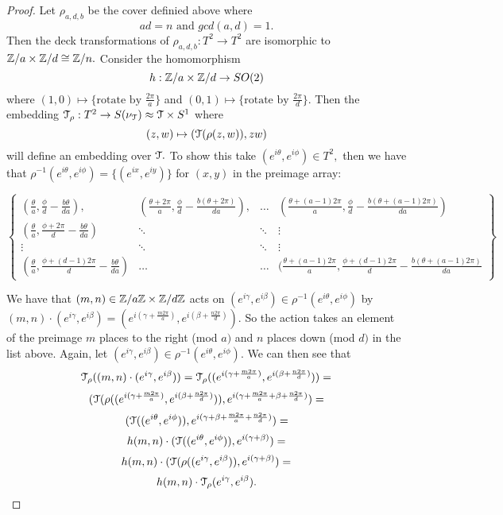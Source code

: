 \documentclass[a4paper, 12 pt, reqno]{amsart}
\theoremstyle{definition}
\theoremstyle{remark}
\begin{document}
\begin{proof} 
Let $\rho_{a,d,b}$ be the cover definied above where $$ad = n \text{ and } gcd(a, d) = 1.$$ Then the deck transformations of $\rho_{a,d,b}: T^{2} \rightarrow T^{2}$ are isomorphic to $\mathbb Z/a \times \mathbb Z/d \cong \mathbb Z/n.$ Consider the homomorphism 
$$h: \mathbb Z/a \times \mathbb Z/d \rightarrow SO(2)$$ where $(1, 0) \mapsto \{\text{rotate by } \frac{2\pi}{a}\}$ and $(0, 1) \mapsto \{\text{rotate by } \frac{2\pi}{d}\}.$ Then the embedding $\mathcal T_{\rho}: T^{2} \rightarrow S(\nu_{\mathcal T}) \approx \mathcal T \times S^{1}$ where $$(z,w) \mapsto (\mathcal T(\rho(z,w)), zw)$$ will define an embedding over $\mathcal T.$ To show this take $(e^{i\theta}, e^{i\phi}) \in T^{2},$ then we have that $\rho^{-1}(e^{i\theta}, e^{i\phi}) = \{(e^{ix}, e^{iy})\}$ for $(x, y)$ in the preimage array:

$$
\begin{Bmatrix} %
(\frac{\theta}{a} , \frac{\phi}{d} - \frac{b\theta}{da}), & (\frac{\theta + 2\pi}{a}, \frac{\phi}{d} - \frac{b(\theta + 2\pi)}{da}), &  \hdots & (\frac{\theta + (a - 1)2\pi}{a}, \frac{\phi}{d} - \frac{b(\theta + (a - 1)2\pi)}{da})\\
(\frac{\theta}{a}, \frac{\phi + 2\pi}{d} - \frac{b\theta}{da}) & \ddots & \ddots & \vdots\\
\vdots & \ddots & \ddots & \vdots\\
(\frac{\theta}{a}, \frac{\phi + (d - 1)2\pi}{d} - \frac{b\theta}{da}) & \hdots & \hdots & (\frac{\theta + (a-1)2\pi}{a} , \frac{\phi + (d - 1)2\pi}{d} - \frac{b(\theta + (a - 1)2\pi)}{da} 
\end{Bmatrix}
$$

 We have that $(m, n) \in \mathbb Z/a\mathbb Z \times \mathbb Z/d\mathbb Z$ acts on $(e^{i\gamma}, e^{i\beta}) \in \rho^{-1}(e^{i\theta}, e^{i\phi})$ by $(m, n) \cdot (e^{i\gamma}, e^{i\beta}) = (e^{i(\gamma + \frac{m2\pi}{a})}, e^{i(\beta + \frac{n2\pi}{d})}).$ So the action takes an element of the preimage $m$ places to the right  (mod $a)$ and $n$ places down (mod $d)$ in the list above. \newline \newline Again, let $(e^{i\gamma}, e^{i\beta}) \in \rho^{-1}(e^{i\theta}, e^{i\phi}).$ We can then see that $$\mathcal T_{\rho}((m, n) \cdot (e^{i\gamma}, e^{i\beta})) = \mathcal T_{\rho}((e^{i(\gamma + \frac{m2\pi}{a})}, e^{i(\beta + \frac{n2\pi}{d})})) = $$
$$(\mathcal T(\rho((e^{i(\gamma + \frac{m2\pi}{a})}, e^{i(\beta + \frac{n2\pi}{d})})), e^{i(\gamma + \frac{m2\pi}{a} + \beta + \frac{n2\pi}{d})}) = $$ 
$$(\mathcal T((e^{i\theta}, e^{i\phi})), e^{i(\gamma + \beta + \frac{m2\pi}{a} + \frac{n2\pi}{d})}) = $$
$$h(m,n) \cdot (\mathcal T((e^{i\theta}, e^{i\phi})), e^{i(\gamma + \beta)})  =$$
$$h(m,n) \cdot (\mathcal T(\rho((e^{i\gamma}, e^{i\beta})), e^{i(\gamma + \beta)})  = $$
$$h(m,n) \cdot \mathcal T_{\rho}(e^{i\gamma}, e^{i\beta}).$$
\end{proof}
\end{document}
